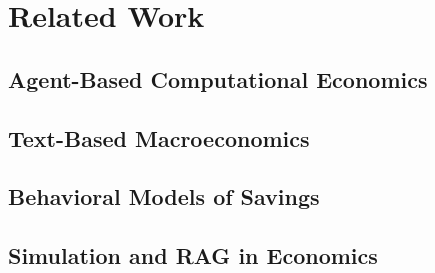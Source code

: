 
\chapter{Related Work}
\label{chap:related_work}


\section{Agent-Based Computational Economics}
\label{sec:abce}


\section{Text-Based Macroeconomics}
\label{sec:text_macro}


\section{Behavioral Models of Savings}
\label{sec:behavioral_savings}


\section{Simulation and RAG in Economics}
\label{sec:sim_rag}


\endinput
